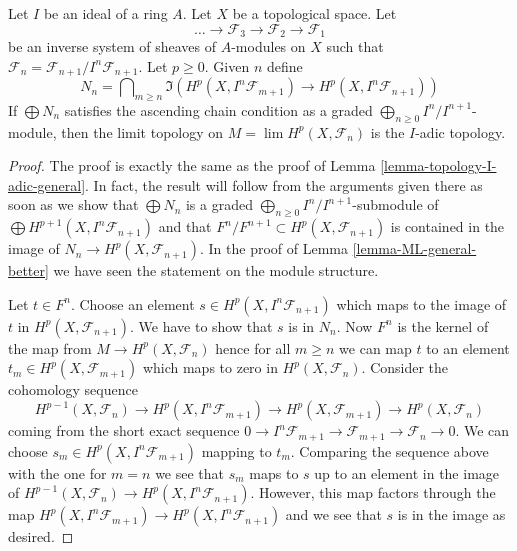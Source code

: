 \begin{lemma}
\label{lemma-topology-I-adic-general-better}
Let $I$ be an ideal of a ring $A$. Let $X$ be a topological space. Let
$$
\ldots \to \mathcal{F}_3 \to \mathcal{F}_2 \to \mathcal{F}_1
$$
be an inverse system of sheaves of $A$-modules on $X$ such that
$\mathcal{F}_n = \mathcal{F}_{n + 1}/I^n\mathcal{F}_{n + 1}$.
Let $p \geq 0$. Given $n$ define
$$
N_n =
\bigcap\nolimits_{m \geq n}
\Im\left(
H^p(X, I^n\mathcal{F}_{m + 1}) \to H^p(X, I^n\mathcal{F}_{n + 1})
\right)
$$
If $\bigoplus N_n$ satisfies the ascending chain condition as a graded
$\bigoplus_{n \geq 0} I^n/I^{n + 1}$-module, then
the limit topology on $M = \lim H^p(X, \mathcal{F}_n)$
is the $I$-adic topology.
\end{lemma}

\begin{proof}
The proof is exactly the same as the proof of
Lemma \ref{lemma-topology-I-adic-general}.
In fact, the result will follow from the arguments given there
as soon as we show that
$\bigoplus N_n$ is a graded $\bigoplus_{n \geq 0} I^n/I^{n + 1}$-submodule
of $\bigoplus H^{p + 1}(X, I^n\mathcal{F}_{n + 1})$
and that $F^n/F^{n + 1} \subset H^p(X, \mathcal{F}_{n + 1})$
is contained in the image of $N_n \to H^p(X, \mathcal{F}_{n + 1})$.
In the proof of Lemma \ref{lemma-ML-general-better}
we have seen the statement on the module structure.

\medskip\noindent
Let $t \in F^n$. Choose an element $s \in H^p(X, I^n\mathcal{F}_{n + 1})$
which maps to the image of $t$ in $H^p(X, \mathcal{F}_{n + 1})$. We have
to show that $s$ is in $N_n$. Now $F^n$ is the kernel of the map from
$M \to H^p(X, \mathcal{F}_n)$ hence for all $m \geq n$ we can map $t$
to an element $t_m \in H^p(X, \mathcal{F}_{m + 1})$ which maps to zero
in $H^p(X, \mathcal{F}_n)$. Consider the cohomology sequence
$$
H^{p - 1}(X, \mathcal{F}_n) \to
H^p(X, I^n\mathcal{F}_{m + 1}) \to
H^p(X, \mathcal{F}_{m + 1}) \to
H^p(X, \mathcal{F}_n)
$$
coming from the short exact sequence
$0 \to I^n\mathcal{F}_{m + 1} \to \mathcal{F}_{m + 1} \to \mathcal{F}_n \to 0$.
We can choose $s_m \in H^p(X, I^n\mathcal{F}_{m + 1})$ mapping to $t_m$.
Comparing the sequence above with the one for $m = n$ we see that
$s_m$ maps to $s$ up to an element in the image of
$H^{p - 1}(X, \mathcal{F}_n) \to H^p(X, I^n\mathcal{F}_{n + 1})$.
However, this map factors through the map
$H^p(X, I^n\mathcal{F}_{m + 1}) \to H^p(X, I^n\mathcal{F}_{n + 1})$
and we see that $s$ is in the image as desired.
\end{proof}






